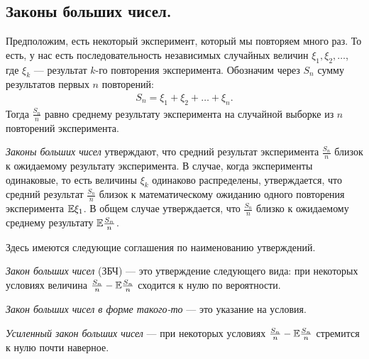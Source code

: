 \documentclass[../main.tex]{subfiles}
\begin{document}
\subsection{Законы больших чисел.}

Предположим, есть некоторый эксперимент, который мы повторяем много раз. То есть, у нас есть последовательность независимых случайных величин $ \xi_1,\xi_2, \ldots $, где $ \xi_k $ --- результат $ k $-го повторения эксперимента. Обозначим через $ S_n $ сумму результатов первых  $ n $  повторений:
\begin{align*}
 S_n = \xi_1 + \xi_2+\ldots+\xi_n.
\end{align*} Тогда $ \frac{S_n}{n} $ равно среднему результату эксперимента на случайной выборке из $ n $  повторений эксперимента.

\textit{Законы больших чисел} утверждают, что средний результат эксперимента $ \frac{S_n}{n} $ близок к ожидаемому результату эксперимента. В случае, когда эксперименты одинаковые, то есть величины $ \xi_k $ одинаково распределены, утверждается, что средний результат  $ \frac{S_n}{n} $  близок к математическому ожиданию одного повторения эксперимента $ \mathbb E \xi_1 $. В общем случае утверждается, что $ \frac{S_n}{n} $ близко к ожидаемому среднему результату $ \mathbb E \frac{S_n}{n} $.

Здесь имеются следующие соглашения по наименованию утверждений.

\textit{Закон больших чисел} (ЗБЧ) --- это утверждение следующего вида: при некоторых условиях величина $ \frac{S_n}{n}-\mathbb E \frac{S_n}{n} $ сходится к нулю по вероятности.

\textit{Закон больших чисел в форме такого-то} --- это указание на условия.

\textit{Усиленный закон больших чисел} --- при некоторых условиях $ \frac{S_n}{n}-\mathbb E \frac{S_n}{n} $ стремится к нулю почти наверное.
\end{document}
